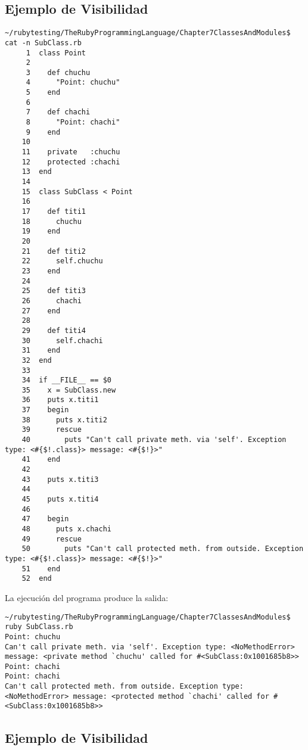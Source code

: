 \subsection{Ejemplo de Visibilidad}
\begin{verbatim}
~/rubytesting/TheRubyProgrammingLanguage/Chapter7ClassesAndModules$ cat -n SubClass.rb 
     1  class Point
     2  
     3    def chuchu
     4      "Point: chuchu"
     5    end
     6  
     7    def chachi
     8      "Point: chachi"
     9    end
    10  
    11    private   :chuchu
    12    protected :chachi
    13  end
    14  
    15  class SubClass < Point
    16  
    17    def titi1 
    18      chuchu
    19    end
    20  
    21    def titi2 
    22      self.chuchu
    23    end
    24  
    25    def titi3
    26      chachi 
    27    end
    28  
    29    def titi4
    30      self.chachi 
    31    end
    32  end
    33  
    34  if __FILE__ == $0
    35    x = SubClass.new
    36    puts x.titi1
    37    begin
    38      puts x.titi2
    39      rescue 
    40        puts "Can't call private meth. via 'self'. Exception type: <#{$!.class}> message: <#{$!}>"
    41    end
    42  
    43    puts x.titi3
    44  
    45    puts x.titi4
    46  
    47    begin
    48      puts x.chachi
    49      rescue
    50        puts "Can't call protected meth. from outside. Exception type: <#{$!.class}> message: <#{$!}>"
    51    end
    52  end
\end{verbatim}

La ejecución del programa produce la salida:
\begin{verbatim}
~/rubytesting/TheRubyProgrammingLanguage/Chapter7ClassesAndModules$ ruby SubClass.rb 
Point: chuchu
Can't call private meth. via 'self'. Exception type: <NoMethodError> message: <private method `chuchu' called for #<SubClass:0x1001685b8>>
Point: chachi
Point: chachi
Can't call protected meth. from outside. Exception type: <NoMethodError> message: <protected method `chachi' called for #<SubClass:0x1001685b8>>
\end{verbatim}


\subsection{Ejemplo de Visibilidad}



